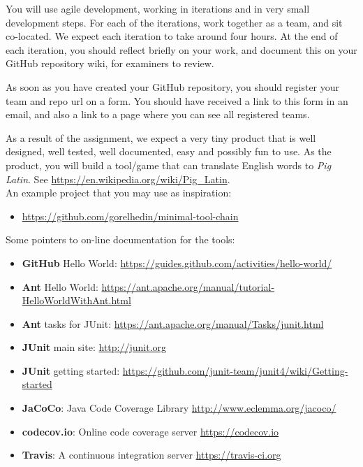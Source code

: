 \documentclass[swedish,english]{article}
\begin{document}
You will use agile development, working in iterations and in very small development steps.
For each of the iterations, work together as a team, and sit co-located. We expect each iteration to take around four hours. At the end of each iteration, you should reflect briefly on your work, and document this on your GitHub repository wiki, for examiners to review.

As soon as you have created your GitHub repository, you should register your team and repo url on a form. You should have received a link to this form in an email, and also a link to a page where you can see all registered teams.

As a result of the assignment, we expect a very tiny product that is well designed, well tested, well documented, easy and possibly fun to use. As the product, you will build a tool/game that can translate English words to \emph{Pig Latin}. See \url{https://en.wikipedia.org/wiki/Pig_Latin}.\\

An example project that you may use as inspiration:

\begin{itemize}
\item \url{https://github.com/gorelhedin/minimal-tool-chain}
\end{itemize}

Some pointers to on-line documentation for the tools:
\begin{itemize}
\item \textbf{GitHub} Hello World: \url{https://guides.github.com/activities/hello-world/}
\item \textbf{Ant} Hello World: \url{https://ant.apache.org/manual/tutorial-HelloWorldWithAnt.html}
\item \textbf{Ant} tasks for JUnit: \url{https://ant.apache.org/manual/Tasks/junit.html}
\item \textbf{JUnit} main site: \url{http://junit.org}
\item \textbf{JUnit} getting started: \url{https://github.com/junit-team/junit4/wiki/Getting-started}
\item \textbf{JaCoCo}: Java Code Coverage Library \url{http://www.eclemma.org/jacoco/}
\item \textbf{codecov.io}: Online code coverage server \url{https://codecov.io}
\item \textbf{Travis}: A continuous integration server \url{https://travis-ci.org}
\end{itemize}
\end{document}
